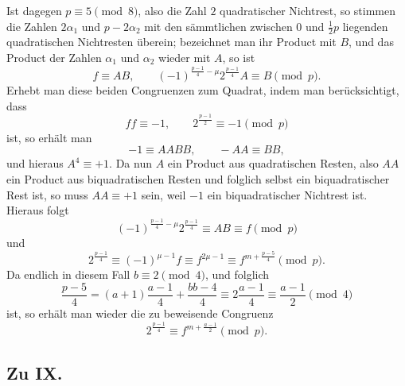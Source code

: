 \documentclass[12pt]{article}
\begin{document}
Ist dagegen \(p\equiv5\pmod8\), also die Zahl \(2\) quadratischer Nichtrest, so stimmen die Zahlen \(2\alpha_1\) und \(p-2\alpha_2\) mit den sämmtlichen zwischen \(0\) und \(\frac12p\) liegenden quadratischen Nichtresten überein; bezeichnet man ihr Product mit \(B\), und das Product der Zahlen \(\alpha_1\) und \(\alpha_2\) wieder mit \(A\), so ist
\[
f\equiv AB,\qquad
(-1)^{\frac{p-1}{4}-\mu}2^{\frac{p-1}{4}}A\equiv B\pmod p.
\]
Erhebt man diese beiden Congruenzen zum Quadrat, indem man berücksichtigt, dass
\[
ff\equiv-1,\qquad 2^{\frac{p-1}{2}}\equiv-1\pmod p
\]
ist, so erhält man
\[
-1\equiv AABB,\qquad -AA\equiv BB,
\]
und hieraus \(A^4\equiv+1\). Da nun \(A\) ein Product aus quadratischen Resten, also \(AA\) ein Product aus biquadratischen Resten und folglich selbst ein biquadratischer Rest ist, so muss \(AA\equiv+1\) sein, weil \(-1\) ein biquadratischer Nichtrest ist. Hieraus folgt
\[
(-1)^{\frac{p-1}{4}-\mu}2^{\frac{p-1}{4}}\equiv AB\equiv f\pmod p
\]
und
\[
2^{\frac{p-1}{4}}\equiv(-1)^{\mu-1}f\equiv f^{2\mu-1}\equiv f^{m+\frac{p-5}{4}}\pmod p.
\]
Da endlich in diesem Fall \(b\equiv2\pmod4\), und folglich
\[
\frac{p-5}{4}=(a+1)\frac{a-1}{4}+\frac{bb-4}{4}
\equiv2\frac{a-1}{4}\equiv\frac{a-1}{2}\pmod4
\]
ist, so erhält man wieder die zu beweisende Congruenz
\[
2^{\frac{p-1}{4}}\equiv f^{m+\frac{a-1}{2}}\pmod p.
\]

\subsection*{Zu IX.}
\end{document}

